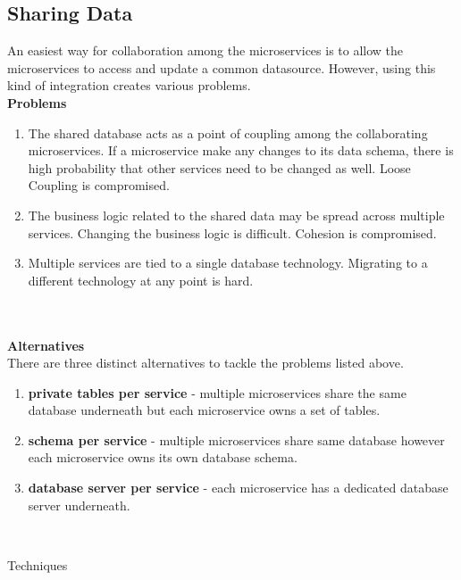 \subsection{Sharing Data}\label{section:challanges_of_microservices_architecture/integration/sharing_data}
An easiest way for collaboration among the microservices is to allow the microservices to access and update a common datasource. However, using this kind of integration creates various problems.\cite{Newman:2015aa}\\
\textbf{Problems}\label{section:challanges_of_microservices_architecture/integration/problems}
\begin{enumerate}
\item The shared database acts as a point of coupling among the collaborating microservices. If a microservice make any changes to its data schema, there is high probability that other services need to be changed as well. Loose Coupling is compromised.
\item The business logic related to the shared data may be spread across multiple services. Changing the business logic is difficult. Cohesion is compromised.
\item Multiple services are tied to a single database technology. Migrating to a different technology at any point is hard.
\end{enumerate}
\\
\\
\textbf{Alternatives}\label{section:challanges_of_microservices_architecture/integration/alternatives}
\\
There are three distinct alternatives to tackle the problems listed above.\cite{Richardson:2015aa}
\begin{enumerate}
\item \textbf{private tables per service} - multiple microservices share the same database underneath but each microservice owns a set of tables.
\item \textbf{schema per service} - multiple microservices share same database however each microservice owns its own database schema.
\item \textbf{database server per service} - each microservice has a dedicated database server underneath.
\end{enumerate}
\\
\begin{shaded}Techniques\end{shaded}\label{section:challanges_of_microservices_architecture/integration/sharing_data/techniques}
\\
